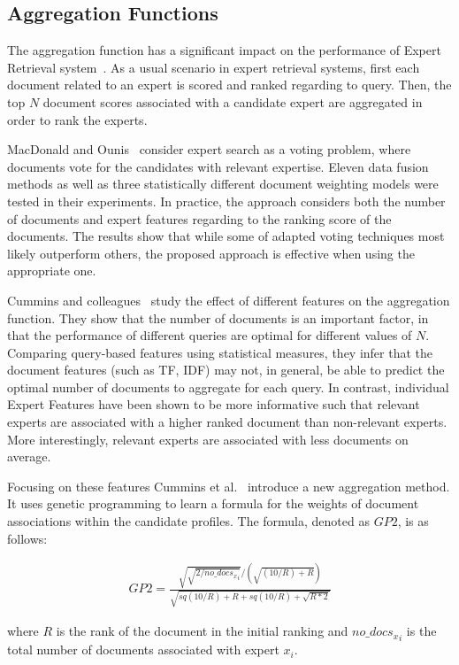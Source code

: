 \subsection{Aggregation Functions}
The aggregation function has a significant impact on the performance of Expert Retrieval system~\cite{agg-gp2}. As a usual scenario in expert retrieval systems, first each document related to an expert is scored and ranked regarding to query. Then, the top $N$ document scores associated with a candidate expert are aggregated in order to rank the experts. 

MacDonald and Ounis~\cite{agg-vote} consider expert search as a voting problem, where documents vote for the candidates with relevant expertise. Eleven data fusion methods as well as three statistically different document weighting models were tested in their experiments. In practice, the approach considers both the number of documents and expert features regarding to the ranking score of the documents. The results show that while some of adapted voting techniques most likely outperform others, the proposed approach is effective when using the appropriate one.

Cummins and colleagues~\cite{agg-gp2}  study the effect of different features on the aggregation function. They show that the number of documents is an important factor, in that the performance of different queries are optimal for different values of $N$. Comparing query-based features using statistical measures, they infer that the document features (such as TF, IDF) may not, in general, be able to predict the optimal number of documents to aggregate for each query. In contrast, individual Expert Features have been shown to be more informative such that relevant experts are associated with a higher ranked document than non-relevant experts. More interestingly, relevant experts are associated with less documents on average.

Focusing on these features Cummins et al.~\cite{agg-gp2} introduce a new aggregation method. It uses genetic programming to learn a formula for the weights of document associations within the candidate profiles. The formula, denoted as $GP2$, is as follows:

\begin{align*}
GP2 = \frac{\sqrt{\sqrt{2/{no\_docs_x}_i}}/(\sqrt{(10/R)+R})}{\sqrt{sq(10/R)+R+sq(10/R)+\sqrt{R*2}}}
\end{align*}

\noindent 
where $R$ is the rank of the document in the initial ranking and ${no\_docs_x}_i$ is the total number of documents associated with expert $x_i$.

